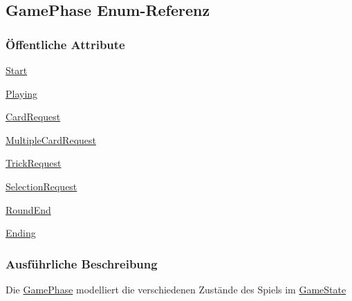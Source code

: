 \hypertarget{a00060}{\subsection{Game\-Phase Enum-\/\-Referenz}
\label{a00060}
}
\subsubsection*{Öffentliche Attribute}
\begin{DoxyCompactItemize}
\item 
\hypertarget{a00060_aedcef5fb0e94ecd6e477e87d7bb5b13a}{\hyperlink{a00060_aedcef5fb0e94ecd6e477e87d7bb5b13a}{Start}}\label{a00060_aedcef5fb0e94ecd6e477e87d7bb5b13a}

\item 
\hypertarget{a00060_adff0cb2b0b9f2305d3d3d0fc7aa6dd46}{\hyperlink{a00060_adff0cb2b0b9f2305d3d3d0fc7aa6dd46}{Playing}}\label{a00060_adff0cb2b0b9f2305d3d3d0fc7aa6dd46}

\item 
\hypertarget{a00060_a7055b9d72a7bfab5868b9cb907e2c879}{\hyperlink{a00060_a7055b9d72a7bfab5868b9cb907e2c879}{Card\-Request}}\label{a00060_a7055b9d72a7bfab5868b9cb907e2c879}

\item 
\hypertarget{a00060_a9ed3275699a5c4a18a970ae681fd10cc}{\hyperlink{a00060_a9ed3275699a5c4a18a970ae681fd10cc}{Multiple\-Card\-Request}}\label{a00060_a9ed3275699a5c4a18a970ae681fd10cc}

\item 
\hypertarget{a00060_a2e7f2f8cb8c643a832e81bf6a57dcd0b}{\hyperlink{a00060_a2e7f2f8cb8c643a832e81bf6a57dcd0b}{Trick\-Request}}\label{a00060_a2e7f2f8cb8c643a832e81bf6a57dcd0b}

\item 
\hypertarget{a00060_ab494ae1b7d3fa6a42d758a1855411093}{\hyperlink{a00060_ab494ae1b7d3fa6a42d758a1855411093}{Selection\-Request}}\label{a00060_ab494ae1b7d3fa6a42d758a1855411093}

\item 
\hypertarget{a00060_a29e3669f94685a3f640da2815ffe4458}{\hyperlink{a00060_a29e3669f94685a3f640da2815ffe4458}{Round\-End}}\label{a00060_a29e3669f94685a3f640da2815ffe4458}

\item 
\hypertarget{a00060_a0fb12b38514cd0c764bf48aee2b12b15}{\hyperlink{a00060_a0fb12b38514cd0c764bf48aee2b12b15}{Ending}}\label{a00060_a0fb12b38514cd0c764bf48aee2b12b15}

\end{DoxyCompactItemize}


\subsubsection{Ausführliche Beschreibung}
Die \hyperlink{a00060}{Game\-Phase} modelliert die verschiedenen Zustände des Spiels im \hyperlink{a00061}{Game\-State} 